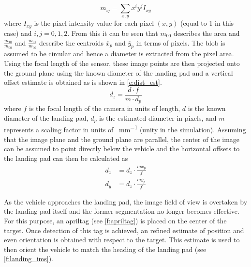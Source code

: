 \begin{equation}\label{e:im_moments}
    m_{ij}=\sum_{x,y}x^iy^jI_{xy}
\end{equation}
where $I_{xy}$ is the pixel intensity value for each pixel $(x,y)$ (equal to 1 in this case) and $i,j =
0,1,2$. From this it can be seen that $m_{00}$ describes the area and $\frac{m_{10}}{m_{00}}$ and
$\frac{m_{01}}{m_{00}}$ describe the centroids $\overline{x}_p$ and $\overline{y}_p$ in terms of pixels. The
blob is assumed to be circular and hence a diameter is extracted from the pixel area. Using the focal length
of the sensor, these image points are then projected onto the ground plane using the known diameter of the
landing pad and a vertical offset estimate is obtained as is shown in \cref{e:dist_est}.
\begin{equation}\label{e:dist_est}
    d_z=\frac{d\cdot f}{m\cdot d_p}
\end{equation}
where $f$ is the focal length of the camera in units of length, $d$ is the known diameter of the landing pad,
$d_p$ is the estimated diameter in pixels, and $m$ represents a scaling factor in units of \si{\px\per\mm}
(unity in the simulation).
Assuming that the image plane and the ground plane are parallel, the center of the image can be assumed to
point directly below the vehicle and the horizontal offsets to the landing pad can then be calculated as
\begin{align}\label{e:horiz_est}
    d_x &= d_z\cdot\frac{m\overline{x}_p}{f}\\
    d_y &= d_z\cdot\frac{m\overline{y}_p}{f}
\end{align}

As the vehicle approaches the landing pad, the image field of view is overtaken by the landing pad itself and
the former segmentation no longer becomes effective. For this purpose, an apriltag\cite{olson2011tags} (see
\cref{f:apriltag}) is placed on the center of the target. Once detection of this tag is achieved, an refined
estimate of position and even orientation is obtained with respect to the target. This estimate is used to
then orient the vehicle to match the heading of the landing pad (see \cref{f:landing_ims}).

